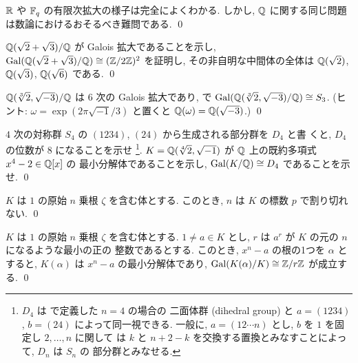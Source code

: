 \documentclass[12pt,twoside]{jarticle}
\begin{document}
\begin{guide}
  ${\mathbb R}$ や ${\mathbb F}_q$ の有限次拡大の様子は完全によくわかる.
  しかし, ${\mathbb Q}$ に関する同じ問題は数論におけるおそるべき難問である.
  \qed
\end{guide}

\begin{question}
  ${\mathbb Q}(\sqrt{2}+\sqrt{3})/{\mathbb Q}$ が Galois 拡大であることを示し,
  $\mathop{\mathrm{Gal}}\nolimits({\mathbb Q}(\sqrt{2}+\sqrt{3})/{\mathbb Q})\cong ({\mathbb Z}/2{\mathbb Z})^2$ を証明し,
  その非自明な中間体の全体は ${\mathbb Q}(\sqrt{2})$, ${\mathbb Q}(\sqrt{3})$, ${\mathbb Q}(\sqrt{6})$
  である. 
  \qed
\end{question}

\begin{question}
  ${\mathbb Q}(\sqrt[3]{2},\sqrt{-3})/{\mathbb Q}$ は $6$ 次の Galois 拡大であり,
  で $\mathop{\mathrm{Gal}}\nolimits({\mathbb Q}(\sqrt[3]{2},\sqrt{-3})/{\mathbb Q})\cong S_3$.
  (ヒント: $\omega=\exp(2\pi\sqrt{-1}/3)$ と置くと %
  ${\mathbb Q}(\omega)={\mathbb Q}(\sqrt{-3})$.) 
  \qed
\end{question}

\begin{question}
  $4$ 次の対称群 $S_4$ の $(1234)$, $(24)$ から生成される部分群を $D_4$ と書
  くと, $D_4$ の位数が $8$ になることを示せ%
  \footnote{$D_4$ は  で定義した $n=4$ の場合の
    二面体群 (dihedral group) と $a=(1234)$, $b=(24)$ によって同一視できる.
    一般に, $a=(12\cdots n)$ とし, $b$ を $1$ を固定し $2,\ldots,n$ に関して
    は $k$ と $n+2-k$ を交換する置換とみなすことによって, $D_n$ は $S_n$ の
    部分群とみなせる.}.
  $K={\mathbb Q}(\sqrt[4]{2},\sqrt{-1})$ が ${\mathbb Q}$ 上の既約多項式 $x^4 - 2\in{\mathbb Q}[x]$ の
  最小分解体であることを示し, $\mathop{\mathrm{Gal}}\nolimits(K/{\mathbb Q})\cong D_4$ であることを示せ.
  \qed
\end{question}

\begin{question}
  $K$ は $1$ の原始 $n$ 乗根 $\zeta$ を含む体とする.
  このとき, $n$ は $K$ の標数 $p$ で割り切れない. \qed
\end{question}

\begin{question}
  $K$ は $1$ の原始 $n$ 乗根 $\zeta$ を含む体とする.
  $1\ne a\in K$ とし, $r$ は $a^r$ が $K$ の元の $n$ になるような最小の正の
  整数であるとする. このとき, $x^n - a$ の根の1つを $\alpha$ とすると,
  $K(\alpha)$ は $x^n - a$ の最小分解体であり, 
  $\mathop{\mathrm{Gal}}\nolimits(K(\alpha)/K)\cong{\mathbb Z}/r{\mathbb Z}$ が成立する. \qed
\end{question}

\end{document}
